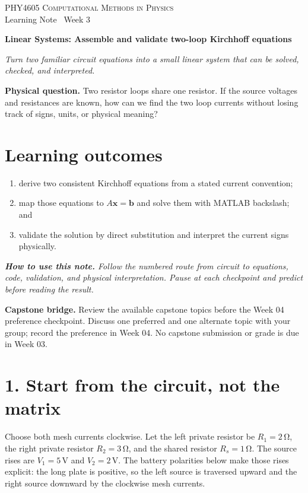 \documentclass[11pt,a4paper]{article}
\newcommand{\course}{PHY4605 Computational Methods in Physics}
\newcommand{\units}[1]{\,\mathrm{#1}}
\begin{document}
{\large\textsc{\course}}\\[-2pt]
{\small Learning Note \textbar\ Week 3}\par\vspace{4pt}
{\LARGE\bfseries Linear Systems: Assemble and validate two-loop Kirchhoff equations}\par\vspace{3pt}
\textit{Turn two familiar circuit equations into a small linear system that can be solved, checked, and interpreted.}

\begin{keybox}\textbf{Physical question.} Two resistor loops share one resistor. If the source voltages and resistances are known, how can we find the two loop currents without losing track of signs, units, or physical meaning?\end{keybox}

\section*{Learning outcomes}
\begin{enumerate}[nosep,leftmargin=5mm]
\item derive two consistent Kirchhoff equations from a stated current convention;
\item map those equations to $A\mathbf{x}=\mathbf{b}$ and solve them with MATLAB backslash; and
\item validate the solution by direct substitution and interpret the current signs physically.
\end{enumerate}

\textit{\textbf{How to use this note.} Follow the numbered route from circuit to equations, code, validation, and physical interpretation. Pause at each checkpoint and predict before reading the result.}

\begin{keybox}\textbf{Capstone bridge.} Review the available capstone topics before the Week 04 preference checkpoint. Discuss one preferred and one alternate topic with your group; record the preference in Week 04. No capstone submission or grade is due in Week 03.\end{keybox}

\section*{1. Start from the circuit, not the matrix}
Choose both mesh currents clockwise. Let the left private resistor be $R_1=2\units{\Omega}$, the right private resistor $R_2=3\units{\Omega}$, and the shared resistor $R_s=1\units{\Omega}$. The source rises are $V_1=5\units{V}$ and $V_2=2\units{V}$. The battery polarities below make those rises explicit: the long plate is positive, so the left source is traversed upward and the right source downward by the clockwise mesh currents.
\end{document}
